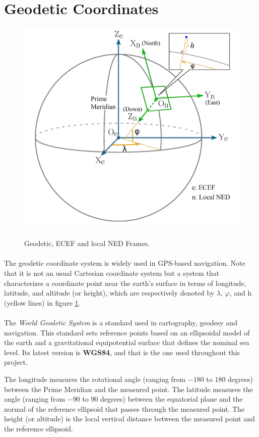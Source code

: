 \section{Geodetic Coordinates}\label{sec:coord}

\begin{figure}[H]
   \centering
    \includegraphics[width=.60\textwidth]{figures/GeoTemp1.png} 
    \label{fig:Geodetic}
    \caption{Geodetic, ECEF and local NED Frames.}  
\end{figure}

\paragraph{}The geodetic coordinate system is widely used in GPS-based navigation. Note that it is not an usual Cartesian coordinate system but a system that
characterizes a coordinate point near the earth’s surface in terms of longitude, latitude, and altitude (or height), which are respectively denoted by $\lambda$, $\varphi$, and h (yellow lines) in figure \ref{fig:Geodetic}.

\paragraph{}The \textit{World Geodetic System} is a standard used in cartography, geodesy and navigation. This standard sets reference points based on an ellipsoidal model of the earth and a gravitational equipotential surface that defines the nominal sea level. Its latest version is \textbf{WGS84}, and that is the one used throughout this project. 

The longitude measures the rotational angle (ranging from $-180$ to $180$ degrees) between the Prime Meridian and the measured point. The latitude measures the angle (ranging from $-90$ to $90$ degrees) between the equatorial plane and the normal of the reference ellipsoid that passes through the measured point. The height (or altitude) is the local vertical distance between the measured point and the reference ellipsoid.

